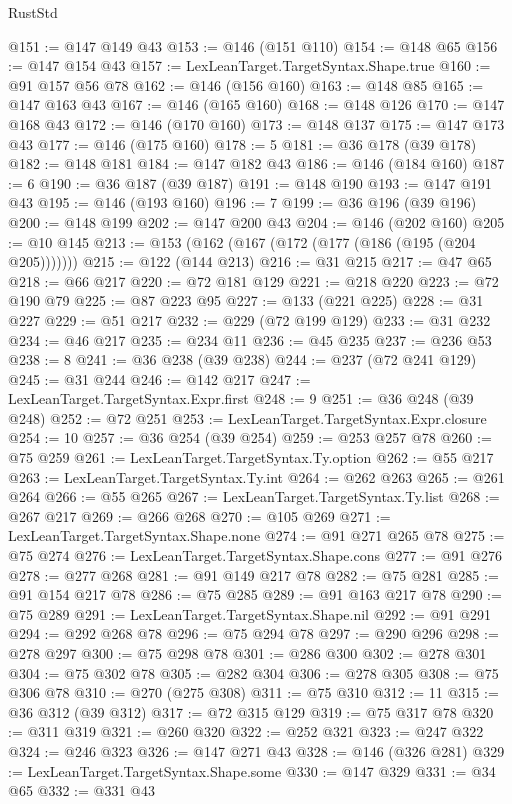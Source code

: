 \begin{lexlean}{RustStd}
\begin{coremodule}
{\begin{coremodule}
{{{{{{{{{{{{{{{{{{{{{{{{{{@151 := @147 @149 @43
@153 := @146 (@151 @110)
@154 := @148 @65
@156 := @147 @154 @43
@157 := LexLeanTarget.TargetSyntax.Shape.true
@160 := @91 @157 @56 @78
@162 := @146 (@156 @160)
@163 := @148 @85
@165 := @147 @163 @43
@167 := @146 (@165 @160)
@168 := @148 @126
@170 := @147 @168 @43
@172 := @146 (@170 @160)
@173 := @148 @137
@175 := @147 @173 @43
@177 := @146 (@175 @160)
@178 := 5
@181 := @36 @178 (@39 @178)
@182 := @148 @181
@184 := @147 @182 @43
@186 := @146 (@184 @160)
@187 := 6
@190 := @36 @187 (@39 @187)
@191 := @148 @190
@193 := @147 @191 @43
@195 := @146 (@193 @160)
@196 := 7
@199 := @36 @196 (@39 @196)
@200 := @148 @199
@202 := @147 @200 @43
@204 := @146 (@202 @160)
@205 := @10 @145
@213 := @153 (@162 (@167 (@172 (@177 (@186 (@195 (@204 @205)))))))
@215 := @122 (@144 @213)
@216 := @31 @215
@217 := @47 @65
@218 := @66 @217
@220 := @72 @181 @129
@221 := @218 @220
@223 := @72 @190 @79
@225 := @87 @223 @95
@227 := @133 (@221 @225)
@228 := @31 @227
@229 := @51 @217
@232 := @229 (@72 @199 @129)
@233 := @31 @232
@234 := @46 @217
@235 := @234 @11
@236 := @45 @235
@237 := @236 @53
@238 := 8
@241 := @36 @238 (@39 @238)
@244 := @237 (@72 @241 @129)
@245 := @31 @244
@246 := @142 @217
@247 := LexLeanTarget.TargetSyntax.Expr.first
@248 := 9
@251 := @36 @248 (@39 @248)
@252 := @72 @251
@253 := LexLeanTarget.TargetSyntax.Expr.closure
@254 := 10
@257 := @36 @254 (@39 @254)
@259 := @253 @257 @78
@260 := @75 @259
@261 := LexLeanTarget.TargetSyntax.Ty.option
@262 := @55 @217
@263 := LexLeanTarget.TargetSyntax.Ty.int
@264 := @262 @263
@265 := @261 @264
@266 := @55 @265
@267 := LexLeanTarget.TargetSyntax.Ty.list
@268 := @267 @217
@269 := @266 @268
@270 := @105 @269
@271 := LexLeanTarget.TargetSyntax.Shape.none
@274 := @91 @271 @265 @78
@275 := @75 @274
@276 := LexLeanTarget.TargetSyntax.Shape.cons
@277 := @91 @276
@278 := @277 @268
@281 := @91 @149 @217 @78
@282 := @75 @281
@285 := @91 @154 @217 @78
@286 := @75 @285
@289 := @91 @163 @217 @78
@290 := @75 @289
@291 := LexLeanTarget.TargetSyntax.Shape.nil
@292 := @91 @291
@294 := @292 @268 @78
@296 := @75 @294 @78
@297 := @290 @296
@298 := @278 @297
@300 := @75 @298 @78
@301 := @286 @300
@302 := @278 @301
@304 := @75 @302 @78
@305 := @282 @304
@306 := @278 @305
@308 := @75 @306 @78
@310 := @270 (@275 @308)
@311 := @75 @310
@312 := 11
@315 := @36 @312 (@39 @312)
@317 := @72 @315 @129
@319 := @75 @317 @78
@320 := @311 @319
@321 := @260 @320
@322 := @252 @321
@323 := @247 @322
@324 := @246 @323
@326 := @147 @271 @43
@328 := @146 (@326 @281)
@329 := LexLeanTarget.TargetSyntax.Shape.some
@330 := @147 @329
@331 := @34 @65
@332 := @331 @43
}}}}}}}}}}}}}}}}}}}}}}}}}}
\end{coremodule}}
\end{coremodule}
\end{lexlean}
